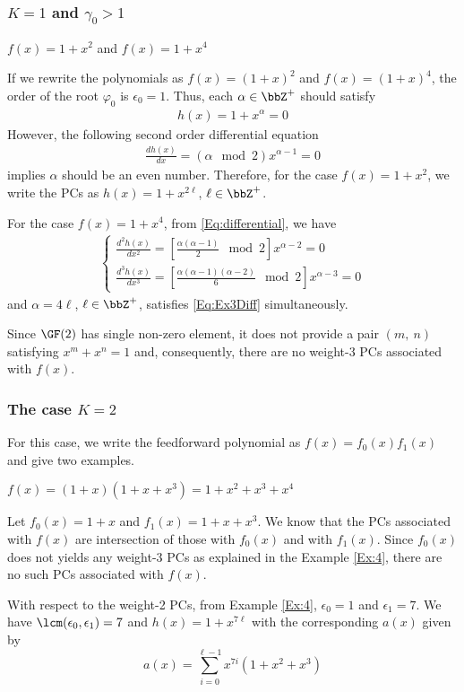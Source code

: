 \subsubsection{$K=1$ and $\gamma_0 > 1$}
\begin{example}
	$f(x)=1+x^2$ and $f(x)=1+x^4$\newline
	
	If we rewrite the polynomials as $f(x)=(1+x)^2$ and $f(x)=(1+x)^4$,	the order of the root $\varphi_0$ is $\epsilon_0=1$. 
	Thus, each $\alpha \in \bbZ^+$ should satisfy
	\begin{align}
		h(x) = 1+x^\alpha = 0
	\end{align}
	However, the following second order differential equation
	\begin{align}
	\frac{dh(x)}{dx} = (\alpha\mod 2) x^{\alpha-1} = 0
	\end{align}
	implies $\alpha$ should be an even number. Therefore, for the case $f(x) = 1+x^2$, we write the PCs as  $h(x)=1+x^{2\ell}$, $\ell \in \bbZ^+$.
	

	For the case $f(x) = 1+x^4$, from \eqref{Eq:differential}, we have
	\begin{align}
		\begin{cases}
		\frac{d^2h(x)}{dx^2} = \left[\frac{\alpha(\alpha-1)}{2} \mod 2\right]x^{\alpha-2} = 0 \\
		\frac{d^3h(x)}{dx^3} = \left[\frac{\alpha(\alpha-1)(\alpha-2)}{6} \mod 2\right]x^{\alpha-3} = 0
		\end{cases}
		\label{Eq:Ex3Diff}
	\end{align}
	and $\alpha=4\ell$, $\ell \in \bbZ^+$, satisfies \eqref{Eq:Ex3Diff} simultaneously.
	
	Since $\GF(2)$ has single non-zero element, it does not provide a pair $(m,~n)$ satisfying $x^m+x^n = 1$ and, consequently, there are no weight-3 PCs associated with $f(x)$.
\label{Ex:4}
\end{example}

\subsubsection{The case $K=2$}

For this case, we write the feedforward polynomial as $f(x) =f_0(x)f_1(x)$ and give two examples.
\begin{example}
	$f(x)= (1+x)(1+x+x^3)=1+x^2+x^3+x^4$\newline
	
	Let $f_0(x)=1+x$ and $f_1(x)=1+x+x^3$. We know that the PCs  associated with $f(x)$ are intersection of those with $f_0(x)$ and with $f_1(x)$. 
	Since $f_0(x)$ does not yields any weight-3 PCs as explained in the Example \ref{Ex:4}, there are no such PCs associated with $f(x)$.
	
	With respect to the weight-2 PCs, from Example \ref{Ex:4}, $\epsilon_0=1$ and $\epsilon_1=7$. We have $\lcm(\epsilon_0,\epsilon_1)=7$ and
	$h(x) =1+x^{7\ell}$
	with the corresponding $a(x)$ given by
	$$a(x) = \sum_{i=0}^{\ell-1} x^{7i}(1+x^2+x^3)$$
	\label{Ex:5}	
\end{example}

